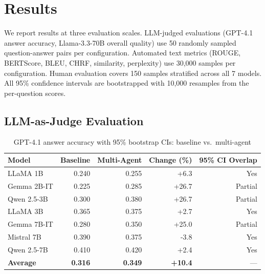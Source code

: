 \section{Results}

We report results at three evaluation scales. LLM-judged evaluations (GPT-4.1 answer accuracy, Llama-3.3-70B overall quality) use 50 randomly sampled question-answer pairs per configuration. Automated text metrics (ROUGE, BERTScore, BLEU, CHRF, similarity, perplexity) use 30,000 samples per configuration. Human evaluation covers 150 samples stratified across all 7 models. All 95\% confidence intervals are bootstrapped with 10,000 resamples from the per-question scores.

\subsection{LLM-as-Judge Evaluation}

\begin{table}[h]
\centering
\caption{GPT-4.1 answer accuracy with 95\% bootstrap CIs: baseline vs.\ multi-agent}
\label{tab:accuracy_gpt41}
\begin{tabular}{lrrrr}
\toprule
\textbf{Model} & \textbf{Baseline} & \textbf{Multi-Agent} & \textbf{Change (\%)} & \textbf{95\% CI Overlap} \\
\midrule
LLaMA 1B & 0.240 & 0.255 & +6.3 & Yes \\
Gemma 2B-IT & 0.225 & 0.285 & +26.7 & Partial \\
Qwen 2.5-3B & 0.300 & 0.380 & +26.7 & Partial \\
LLaMA 3B & 0.365 & 0.375 & +2.7 & Yes \\
Gemma 7B-IT & 0.280 & 0.350 & +25.0 & Partial \\
Mistral 7B & 0.390 & 0.375 & -3.8 & Yes \\
Qwen 2.5-7B & 0.410 & 0.420 & +2.4 & Yes \\
\midrule
\textbf{Average} & \textbf{0.316} & \textbf{0.349} & \textbf{+10.4} & --- \\
\bottomrule
\end{tabular}
\end{table}


